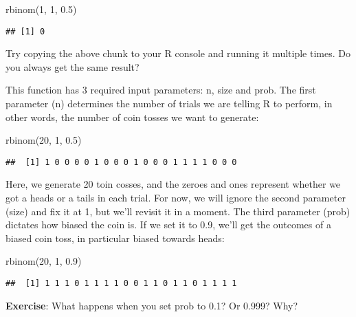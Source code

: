 \documentclass[
]{book}
\newenvironment{Shaded}{\begin{snugshade}}{\end{snugshade}}
\newcommand{\DecValTok}[1]{\textcolor[rgb]{0.00,0.00,0.81}{#1}}
\newcommand{\FloatTok}[1]{\textcolor[rgb]{0.00,0.00,0.81}{#1}}
\newcommand{\FunctionTok}[1]{\textcolor[rgb]{0.00,0.00,0.00}{#1}}
\newcommand{\NormalTok}[1]{#1}
\begin{document}
\begin{Shaded}
\begin{Highlighting}[]
\FunctionTok{rbinom}\NormalTok{(}\DecValTok{1}\NormalTok{, }\DecValTok{1}\NormalTok{, }\FloatTok{0.5}\NormalTok{)}
\end{Highlighting}
\end{Shaded}

\begin{verbatim}
## [1] 0
\end{verbatim}

Try copying the above chunk to your R console and running it multiple times. Do you always get the same result?

This function has 3 required input parameters: n, size and prob. The first parameter (n) determines the number of trials we are telling R to perform, in other words, the number of coin tosses we want to generate:

\begin{Shaded}
\begin{Highlighting}[]
\FunctionTok{rbinom}\NormalTok{(}\DecValTok{20}\NormalTok{, }\DecValTok{1}\NormalTok{, }\FloatTok{0.5}\NormalTok{)}
\end{Highlighting}
\end{Shaded}

\begin{verbatim}
##  [1] 1 0 0 0 0 1 0 0 0 1 0 0 0 1 1 1 1 0 0 0
\end{verbatim}

Here, we generate 20 toin cosses, and the zeroes and ones represent whether we got a heads or a tails in each trial. For now, we will ignore the second parameter (size) and fix it at 1, but we'll revisit it in a moment. The third parameter (prob) dictates how biased the coin is. If we set it to 0.9, we'll get the outcomes of a biased coin toss, in particular biased towards heads:

\begin{Shaded}
\begin{Highlighting}[]
\FunctionTok{rbinom}\NormalTok{(}\DecValTok{20}\NormalTok{, }\DecValTok{1}\NormalTok{, }\FloatTok{0.9}\NormalTok{)}
\end{Highlighting}
\end{Shaded}

\begin{verbatim}
##  [1] 1 1 1 0 1 1 1 1 0 0 1 1 0 1 1 0 1 1 1 1
\end{verbatim}

\textbf{Exercise}: What happens when you set prob to 0.1? Or 0.999? Why?
\end{document}
